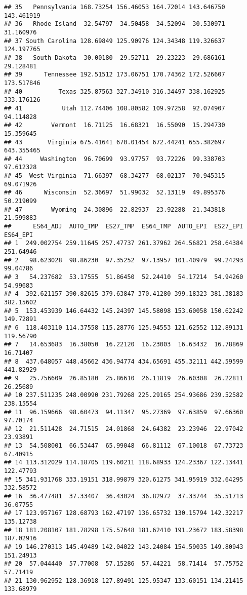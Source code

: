 \documentclass[
]{article}
\begin{document}
\begin{verbatim}
## 35   Pennsylvania 168.73254 156.46053 164.72014 143.646750 143.461919
## 36   Rhode Island  32.54797  34.50458  34.52094  30.530971  31.160976
## 37 South Carolina 128.69849 125.90976 124.34348 119.326637 124.197765
## 38   South Dakota  30.00180  29.52711  29.23223  29.686161  29.128481
## 39      Tennessee 192.51512 173.06751 170.74362 172.526607 173.517846
## 40          Texas 325.87563 327.34910 316.34497 338.162925 333.176126
## 41           Utah 112.74406 108.80582 109.97258  92.074907  94.114828
## 42        Vermont  16.71125  16.68321  16.55090  15.294730  15.359645
## 43       Virginia 675.41641 670.01454 672.44241 655.382697 643.355465
## 44     Washington  96.70699  93.97757  93.72226  99.338703  97.612328
## 45  West Virginia  71.66397  68.34277  68.02137  70.945315  69.071926
## 46      Wisconsin  52.36697  51.99032  52.13119  49.895376  50.219099
## 47        Wyoming  24.30896  22.82937  23.92288  21.343818  21.599883
##      ES64_ADJ  AUTO_TMP  ES27_TMP  ES64_TMP  AUTO_EPI  ES27_EPI  ES64_EPI
## 1  249.002754 259.11645 257.47737 261.37962 264.56821 258.64384 251.64946
## 2   98.623028  98.86230  97.35252  97.13957 101.40979  99.24293  99.04786
## 3   54.237682  53.17555  51.86450  52.24410  54.17214  54.94260  54.99683
## 4  392.621157 390.82615 379.63847 370.41280 399.18323 381.38183 382.15602
## 5  153.453939 146.64432 145.24397 145.58098 153.60058 150.62242 149.72891
## 6  118.403110 114.37558 115.28776 125.94553 121.62552 112.89131 119.56790
## 7   14.653683  16.38050  16.22120  16.23003  16.63432  16.78869  16.71407
## 8  437.648057 448.45662 436.94774 434.65691 455.32111 442.59599 441.82929
## 9   25.756609  26.85180  25.86610  26.11819  26.60308  26.22811  26.25689
## 10 237.511235 248.00990 231.79268 225.29165 254.93686 239.52582 238.15554
## 11  96.159666  98.60473  94.11347  95.27369  97.63859  97.66360  97.70174
## 12  21.511428  24.71515  24.01868  24.64382  23.23946  22.97042  23.93891
## 13  54.508001  66.53447  65.99048  66.81112  67.10018  67.73723  67.40915
## 14 113.312029 114.18705 119.60211 118.68933 124.23367 122.13441 122.47793
## 15 341.931768 333.19151 318.99879 320.61275 341.95919 332.64295 332.58572
## 16  36.477481  37.33407  36.43024  36.82972  37.33744  35.51713  36.07755
## 17 123.957167 128.68793 162.47197 136.65732 130.15794 142.32217 135.12738
## 18 181.208107 181.78298 175.57648 181.62410 191.23672 183.58398 187.02916
## 19 146.270313 145.49489 142.04022 143.24084 154.59035 149.80943 151.24913
## 20  57.044440  57.77008  57.15286  57.44221  58.71414  57.75752  57.71419
## 21 130.962952 128.36918 127.89491 125.95347 133.60151 134.21415 133.68979

\end{verbatim}
\end{document}
